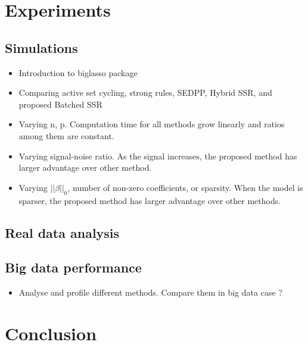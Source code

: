 \documentclass{article}
\begin{document}
\section{Experiments}
\label{sec:5}

\subsection{Simulations}
\label{sec:sim}
\begin{itemize}
    \item Introduction to biglasso package
\end{itemize}
\begin{itemize}
    \item Comparing active set cycling, strong rules, SEDPP, Hybrid SSR, and proposed Batched SSR
    \item Varying n, p. Computation time for all methods grow linearly and ratios among them are constant.
    \item Varying signal-noise ratio. As the signal increases, the proposed method has larger advantage over other method.
    \item Varying $||\beta||_0$, number of non-zero coefficients, or sparsity. When the model is sparser, the proposed method has larger advantage over other methods.
\end{itemize}

\subsection{Real data analysis}
\label{sec:real-data}

\subsection{Big data performance}

\begin{itemize}
    \item Analyse and profile different methods. Compare them in big data case ?
\end{itemize}

\section{Conclusion}
\label{sec:6}




\end{document}
